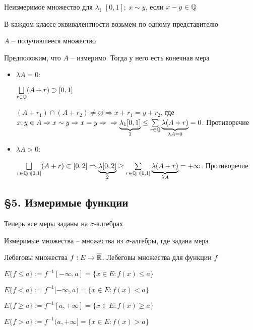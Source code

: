 \documentclass[12pt]{article}
\begin{document}
\begin{Example}{Неизмеримое множество для $\lambda_1$}
    $[0, 1];\ x \sim y$, если $x - y \in \mathbb Q$

    В каждом классе эквивалентности возьмем по одному представителю

    $A$ -- получившееся множество

    Предположим, что $A$ -- измеримо. Тогда у него есть конечная мера

    \begin{itemize}
        \item $\lambda A = 0$:
        
        $\bigsqcup\limits_{r \in \mathbb Q} (A + r) \supset [0, 1]$
        
        $(A + r_1) \cap (A + r_2) \neq \varnothing \Rightarrow x + r_1 = y + r_2$, где $x, y \in A \Rightarrow x \sim y \Rightarrow x = y \Rightarrow \\
        \Rightarrow \underbrace{\lambda_1[0, 1]}_{1} \leq \sum\limits_{r \in \mathbb Q} \underbrace{\lambda(A + r)}_{\lambda A = 0} = 0$. Противоречие

        \item $\lambda A > 0$:
        
        $\bigsqcup\limits_{r \in \mathbb Q \cap [0, 1]} (A + r) \subset [0, 2] \Rightarrow \underbrace{\lambda[0, 2]}_{2} \geq \sum\limits_{r \in \mathbb Q \cap [0, 1]} \underbrace{\lambda(A + r)}_{\lambda A} = + \infty$. Противоречие 
    \end{itemize}
\end{Example}

\newpage 

\subsection{\S 5. Измеримые функции}

\begin{nota}{}
    Теперь все меры заданы на $\sigma$-алгебрах

    Измеримые множества -- множества из $\sigma$-алгебры, где задана мера
\end{nota}

\begin{defin}{Лебеговы множества}
    $f : E \to \overline{\mathbb R}$. Лебеговы множества для функции $f$

    $E\{f \leq a\} := f^{-1}[-\infty, a] = \{x \in E : f(x) \leq a\}$

    $E\{f < a\} := f^{-1}[-\infty, a) = \{x \in E : f(x) < a\}$

    $E\{f \geq a\} := f^{-1}[a, + \infty] = \{x \in E : f(x) \geq a\}$

    $E\{f > a\} := f^{-1}(a, + \infty] = \{x \in E : f(x) > a\}$
\end{defin}
\end{document}
